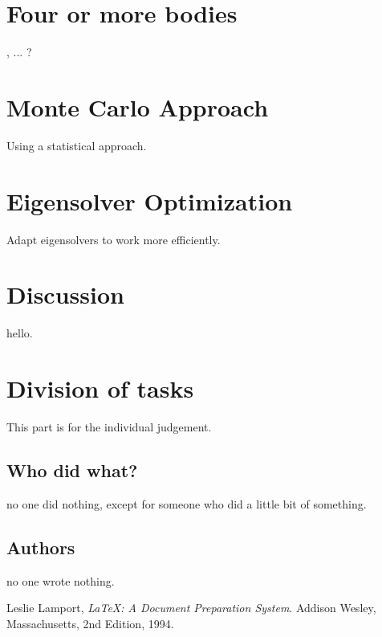 \documentclass[12pt,a4paper]{report}
\begin{document}
\chapter{Four or more bodies} %
\label{cha:four_or_more_bodies}

,  ... ?


\chapter{Monte Carlo Approach}
\label{cha:monte_carlo_approach}

Using a statistical approach.

\chapter{Eigensolver Optimization}
\label{cha: eigensolver}

Adapt eigensolvers to work more efficiently.

\chapter{Discussion}
\label{discussion}

hello.

\chapter{Division of tasks}
\label{division}
This part is for the individual judgement.

\section{Who did what?}
no one did nothing, except for someone who did a little bit of something.
\section{Authors}
no one wrote nothing.


\begin{thebibliography}{9}

  Leslie Lamport,
  \emph{\LaTeX: A Document Preparation System}.
  Addison Wesley, Massachusetts,
  2nd Edition,
  1994.

\end{thebibliography}

\appendix
\end{document}
